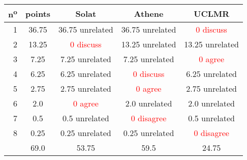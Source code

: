 \begin{center}
 \begin{tabular}{ r | c || c c c }
  n\textsuperscript{o} & points & Solat                      & Athene                      & UCLMR                       \\ \hline
  1                    & 36.75  & 36.75 unrelated            & 36.75 unrelated             & \textcolor{red}{0 discuss}  \\
  2                    & 13.25  & \textcolor{red}{0 discuss} & 13.25 unrelated             & 13.25 unrelated             \\
  3                    & 7.25   & 7.25 unrelated             & 7.25 unrelated              & \textcolor{red}{0 agree}    \\
  4                    & 6.25   & 6.25 unrelated             & \textcolor{red}{0 discuss}  & 6.25 unrelated              \\
  5                    & 2.75   & 2.75 unrelated             & \textcolor{red}{0 agree}    & 2.75 unrelated              \\
  6                    & 2.0    & \textcolor{red}{0 agree}   & 2.0 unrelated               & 2.0 unrelated               \\
  7                    & 0.5    & 0.5 unrelated              & \textcolor{red}{0 disagree} & 0.5 unrelated               \\
  8                    & 0.25   & 0.25 unrelated             & 0.25 unrelated              & \textcolor{red}{0 disagree} \\ \hline
                       & 69.0   & 53.75                      & 59.5                        & 24.75                       \\
 \end{tabular}
\end{center}
